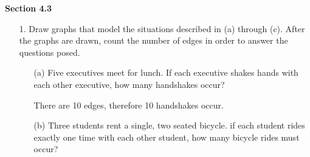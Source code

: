 \documentclass{article}
\begin{document}
\textbf{Section 4.3}

\begin{itemize}
    \item[1.] Draw graphs that model the situations described in (a) through (c).  After the graphs are drawn, count the number of edges in order to answer the questions posed.
    \begin{itemize}
        \item[(a)] Five executives meet for lunch.  If each executive shakes hands with each other executive, how many handshakes occur?
        
        \begin{center}
        \end{center}
        
        {\color{blue} There are 10 edges, therefore 10 handshakes occur.}
        
        \item[(b)] Three students rent a single, two seated bicycle.  if each student rides exactly one time with each other student, how many bicycle rides must occur?
        
        \begin{center}
        \end{center}
        

\end{itemize}
\end{itemize}
\end{document}
